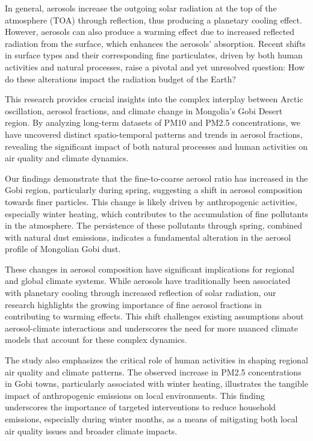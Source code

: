 \documentclass[
  11pt,
]{article}
\begin{document}
In general, aerosols increase the outgoing solar radiation at the top of
the atmosphere (TOA) through reflection, thus producing a planetary
cooling effect. However, aerosols can also produce a warming effect due
to increased reflected radiation from the surface, which enhances the
aerosols' absorption. Recent shifts in surface types and their
corresponding fine particulates, driven by both human activities and
natural processes, raise a pivotal and yet unresolved question: How do
these alterations impact the radiation budget of the Earth?

This research provides crucial insights into the complex interplay
between Arctic oscillation, aerosol fractions, and climate change in
Mongolia's Gobi Desert region. By analyzing long-term datasets of PM10
and PM2.5 concentrations, we have uncovered distinct spatio-temporal
patterns and trends in aerosol fractions, revealing the significant
impact of both natural processes and human activities on air quality and
climate dynamics.

Our findings demonstrate that the fine-to-coarse aerosol ratio has
increased in the Gobi region, particularly during spring, suggesting a
shift in aerosol composition towards finer particles. This change is
likely driven by anthropogenic activities, especially winter heating,
which contributes to the accumulation of fine pollutants in the
atmosphere. The persistence of these pollutants through spring, combined
with natural dust emissions, indicates a fundamental alteration in the
aerosol profile of Mongolian Gobi dust.

These changes in aerosol composition have significant implications for
regional and global climate systems. While aerosols have traditionally
been associated with planetary cooling through increased reflection of
solar radiation, our research highlights the growing importance of fine
aerosol fractions in contributing to warming effects. This shift
challenges existing assumptions about aerosol-climate interactions and
underscores the need for more nuanced climate models that account for
these complex dynamics.

The study also emphasizes the critical role of human activities in
shaping regional air quality and climate patterns. The observed increase
in PM2.5 concentrations in Gobi towns, particularly associated with
winter heating, illustrates the tangible impact of anthropogenic
emissions on local environments. This finding underscores the importance
of targeted interventions to reduce household emissions, especially
during winter months, as a means of mitigating both local air quality
issues and broader climate impacts.
\end{document}
